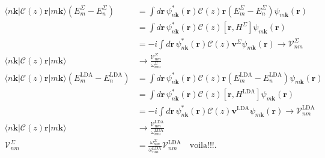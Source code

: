 \begin{align}\label{cdg.1}
\langle n\mathbf{k}\vert\mathcal{C}(z)\mathbf{r}\vert m\mathbf{k}\rangle(E^\Sigma_m-E^\Sigma_n) 
&=
\int d\mathbf{r}\,\psi^*_{n\mathbf{k}}(\mathbf{r}) 
\mathcal{C}(z)\mathbf{r} (E^\Sigma_m-E^\Sigma_n) 
\psi_{m\mathbf{k}}(\mathbf{r}) 
\nonumber\\
&=
\int d\mathbf{r}\,\psi^*_{n\mathbf{k}}(\mathbf{r}) 
\mathcal{C}(z)[\mathbf{r},H^\Sigma]
\psi_{m\mathbf{k}}(\mathbf{r}) 
\nonumber\\
&=
-i\int d\mathbf{r}\,\psi^*_{n\mathbf{k}}(\mathbf{r}) 
\mathcal{C}(z)\mathbf{v}^\Sigma 
\psi_{m\mathbf{k}}(\mathbf{r}) 
\to 
\boldsymbol{\mathcal{V}}^\Sigma_{nm}
\nonumber\\
\langle n\mathbf{k}\vert\mathcal{C}(z)\mathbf{r}\vert m\mathbf{k}\rangle
&\to 
\frac{\boldsymbol{\mathcal{V}}^\Sigma_{nm}}{\omega^\Sigma_{nm}}
\nonumber\\
\langle n\mathbf{k}\vert\mathcal{C}(z)\mathbf{r}\vert m\mathbf{k}\rangle(E^\mathrm{LDA}_m-E^\mathrm{LDA}_n) 
&=
\int d\mathbf{r}\,\psi^*_{n\mathbf{k}}(\mathbf{r}) 
\mathcal{C}(z)\mathbf{r} (E^\mathrm{LDA}_m-E^\mathrm{LDA}_n) 
\psi_{m\mathbf{k}}(\mathbf{r}) 
\nonumber\\
&=
\int d\mathbf{r}\,\psi^*_{n\mathbf{k}}(\mathbf{r}) 
\mathcal{C}(z)[\mathbf{r},H^\mathrm{LDA}]
\psi_{m\mathbf{k}}(\mathbf{r}) 
\nonumber\\
&=
-i\int d\mathbf{r}\,\psi^*_{n\mathbf{k}}(\mathbf{r}) 
\mathcal{C}(z)\mathbf{v}^\mathrm{LDA} 
\psi_{m\mathbf{k}}(\mathbf{r}) 
\to 
\boldsymbol{\mathcal{V}}^\mathrm{LDA}_{nm}
\nonumber\\
\langle n\mathbf{k}\vert\mathcal{C}(z)\mathbf{r}\vert m\mathbf{k}\rangle
&\to 
\frac{\boldsymbol{\mathcal{V}}^\mathrm{LDA}_{nm}}{\omega^\mathrm{LDA}_{nm}}
\nonumber\\
\boldsymbol{\mathcal{V}}^\Sigma_{nm}
&=
\frac{\omega^\Sigma_{nm}}{\omega^\mathrm{LDA}_{nm}}
\boldsymbol{\mathcal{V}}^\mathrm{LDA}_{nm}\quad{\mathrm{voila}!!!}
.
\end{align}

\stopcontents[chapters]
